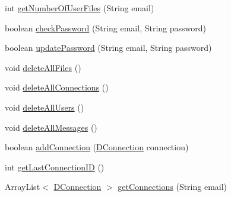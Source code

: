 \begin{DoxyCompactItemize}
\item 
int \mbox{\hyperlink{classes_1_1deusto_1_1bspq18_1_1e6_1_1_deusto_box_1_1_server_1_1jdo_1_1dao_1_1_deusto_box_d_a_o_a9487ee775445414a5b562b1e2c77afc7}{get\+Number\+Of\+User\+Files}} (String email)
\item 
boolean \mbox{\hyperlink{classes_1_1deusto_1_1bspq18_1_1e6_1_1_deusto_box_1_1_server_1_1jdo_1_1dao_1_1_deusto_box_d_a_o_a59f48069908a66b9711a3aa6c7a20c41}{check\+Password}} (String email, String password)
\item 
boolean \mbox{\hyperlink{classes_1_1deusto_1_1bspq18_1_1e6_1_1_deusto_box_1_1_server_1_1jdo_1_1dao_1_1_deusto_box_d_a_o_aee61a6f577f75d59d725644c1fc47f6b}{update\+Password}} (String email, String password)
\item 
void \mbox{\hyperlink{classes_1_1deusto_1_1bspq18_1_1e6_1_1_deusto_box_1_1_server_1_1jdo_1_1dao_1_1_deusto_box_d_a_o_a07df24c6fd58e408892f8f4bd39931c4}{delete\+All\+Files}} ()
\item 
void \mbox{\hyperlink{classes_1_1deusto_1_1bspq18_1_1e6_1_1_deusto_box_1_1_server_1_1jdo_1_1dao_1_1_deusto_box_d_a_o_ab3e381e995e007128725c851650d2fde}{delete\+All\+Connections}} ()
\item 
void \mbox{\hyperlink{classes_1_1deusto_1_1bspq18_1_1e6_1_1_deusto_box_1_1_server_1_1jdo_1_1dao_1_1_deusto_box_d_a_o_a7c2b9657c40ace84e9ddb2a1750e6ee2}{delete\+All\+Users}} ()
\item 
void \mbox{\hyperlink{classes_1_1deusto_1_1bspq18_1_1e6_1_1_deusto_box_1_1_server_1_1jdo_1_1dao_1_1_deusto_box_d_a_o_acfd7aa92ccb93a6fcb20015156118f03}{delete\+All\+Messages}} ()
\item 
boolean \mbox{\hyperlink{classes_1_1deusto_1_1bspq18_1_1e6_1_1_deusto_box_1_1_server_1_1jdo_1_1dao_1_1_deusto_box_d_a_o_a08be11b50fb6622c2b3a961f24c1d940}{add\+Connection}} (\mbox{\hyperlink{classes_1_1deusto_1_1bspq18_1_1e6_1_1_deusto_box_1_1_server_1_1jdo_1_1data_1_1_d_connection}{D\+Connection}} connection)
\item 
int \mbox{\hyperlink{classes_1_1deusto_1_1bspq18_1_1e6_1_1_deusto_box_1_1_server_1_1jdo_1_1dao_1_1_deusto_box_d_a_o_a93943c61dcd773e7d4828fd99b5904c9}{get\+Last\+Connection\+ID}} ()
\item 
Array\+List$<$ \mbox{\hyperlink{classes_1_1deusto_1_1bspq18_1_1e6_1_1_deusto_box_1_1_server_1_1jdo_1_1data_1_1_d_connection}{D\+Connection}} $>$ \mbox{\hyperlink{classes_1_1deusto_1_1bspq18_1_1e6_1_1_deusto_box_1_1_server_1_1jdo_1_1dao_1_1_deusto_box_d_a_o_a108d2f8a1699240f686d31a66245021f}{get\+Connections}} (String email)

\end{DoxyCompactItemize}
